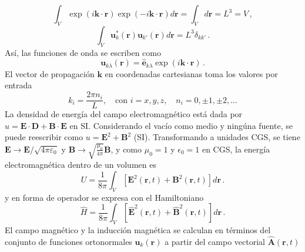 \begin{equation*}
  \int_V \exp{(i\mathbf{k}\cdot\mathbf{r})} \exp{(-i\mathbf{k}\cdot\mathbf{r})} d\mathbf{r}
  =  \int_V d\mathbf{r}
  =  L^3 = V \,,
\end{equation*}
\begin{equation}
  \label{EM.14}
  \int_V \mathbf{u}^{*}_k(\mathbf{r}) \mathbf{u}_{k'}(\mathbf{r}) d\mathbf{r} = L^3\delta_{kk'} \,.
\end{equation}
Así, las funciones de onda se escriben como
\begin{equation}
  \label{EM.15}
  \mathbf{u}_{k\lambda}(\mathbf{r}) = \mathbf{\hat{e}}_{k\lambda} \exp\left({i\mathbf{k}\cdot \mathbf{r}}\right) \,.
\end{equation}
El vector de propagación $\mathbf{k}$ en coordenadas cartesianas toma los valores por entrada
\begin{equation}
  \label{EM.16}
  k_i = \frac{2\pi n_i}{L}, \quad \text{con } i=x,y,z , \quad n_i = 0, \pm1, \pm 2, \dots
\end{equation}
La densidad de energía del campo electromagnético está dada por $u = \mathbf{E} \cdot \mathbf{D} + \mathbf{B} \cdot \mathbf{E}$ en SI. Considerando el vacío como medio y ningúna fuente, se puede reescribir como $u = \mathbf{E}^2 + \mathbf{B}^2$ (SI). Transformando a unidades CGS, se tiene $\mathbf{E} \to \mathbf{E}/\sqrt{4\pi \varepsilon_0}$ y $\mathbf{B} \to \sqrt{\frac{\mu_0}{4\pi}}\mathbf{B}$, y como $\mu_0=1$ y $\epsilon_0 = 1$ en CGS, la energía electromagnética dentro de un volumen es
\begin{equation}
  \label{EM.17}
  U = \frac{1}{8\pi}\int_V \left[ \mathbf{E}^2(\mathbf{r}, t) + \mathbf{B}^2(\mathbf{r}, t) \right] d\mathbf{r} \,.
\end{equation}
y en forma de operador se expresa con el Hamiltoniano
\begin{equation}
  \label{EM.17H}
  \hat{H} = \frac{1}{8\pi}\int_V \left[ \hat{\mathbf{E}}^2(\mathbf{r}, t) + \hat{\mathbf{B}}^2(\mathbf{r}, t) \right] d\mathbf{r} \,.
\end{equation}
El campo magnético y la inducción magnética se calculan en términos del conjunto de funciones ortonormales $\mathbf{u}_k(\mathbf{r})$ a partir del campo vectorial $\hat{\mathbf{A}}(\mathbf{r}, t)$
